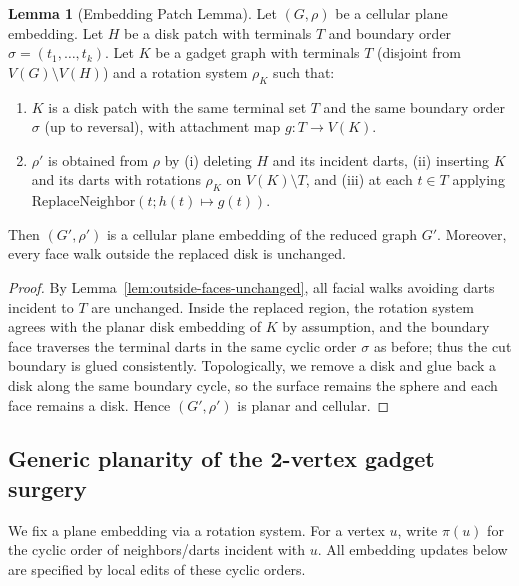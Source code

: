 \documentclass[12pt]{article}
\theoremstyle{definition}
\newtheorem{lemma}[theorem]{Lemma}
\newcommand{\RefinedCFourGadgetVertices}{2}
\begin{document}
\begin{lemma}[Embedding Patch Lemma]
\label{lem:embedding-patch}
Let $(G,\rho)$ be a cellular plane embedding.  Let $H$ be a disk patch with terminals $T$ and boundary order
$\sigma=(t_1,\dots,t_k)$.
Let $K$ be a gadget graph with terminals $T$ (disjoint from $V(G)\setminus V(H)$) and a rotation system $\rho_K$
such that:
\begin{enumerate}
  \item $K$ is a disk patch with the same terminal set $T$ and the same boundary order $\sigma$
        (up to reversal), with attachment map $g:T\to V(K)$.
  \item $\rho'$ is obtained from $\rho$ by (i) deleting $H$ and its incident darts,
        (ii) inserting $K$ and its darts with rotations $\rho_K$ on $V(K)\setminus T$,
        and (iii) at each $t\in T$ applying $\mathrm{ReplaceNeighbor}(t;h(t)\mapsto g(t))$.
\end{enumerate}
Then $(G',\rho')$ is a cellular plane embedding of the reduced graph $G'$.
Moreover, every face walk outside the replaced disk is unchanged.
\end{lemma}
\begin{proof}
By Lemma~\ref{lem:outside-faces-unchanged}, all facial walks avoiding darts incident to $T$ are unchanged.
Inside the replaced region, the rotation system agrees with the planar disk embedding of $K$ by assumption,
and the boundary face traverses the terminal darts in the same cyclic order $\sigma$ as before; thus the cut boundary
is glued consistently.  Topologically, we remove a disk and glue back a disk along the same boundary cycle, so the
surface remains the sphere and each face remains a disk.  Hence $(G',\rho')$ is planar and cellular.
\end{proof}


\subsection{Generic planarity of the \RefinedCFourGadgetVertices-vertex gadget surgery}
\label{subsec:generic-2v-planarity}

We fix a plane embedding via a rotation system.
For a vertex $u$, write $\pi(u)$ for the cyclic order of neighbors/darts incident with $u$.
All embedding updates below are specified by local edits of these cyclic orders.
\end{document}
